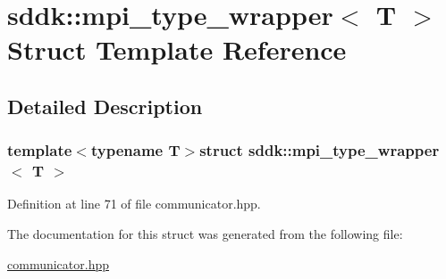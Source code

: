 \hypertarget{structsddk_1_1mpi__type__wrapper}{}\section{sddk\+:\+:mpi\+\_\+type\+\_\+wrapper$<$ T $>$ Struct Template Reference}
\label{structsddk_1_1mpi__type__wrapper}


\subsection{Detailed Description}
\subsubsection*{template$<$typename T$>$struct sddk\+::mpi\+\_\+type\+\_\+wrapper$<$ T $>$}



Definition at line 71 of file communicator.\+hpp.



The documentation for this struct was generated from the following file\+:\begin{DoxyCompactItemize}
\item 
\hyperlink{communicator_8hpp}{communicator.\+hpp}\end{DoxyCompactItemize}
